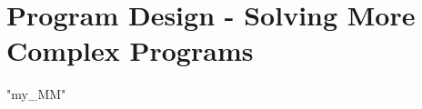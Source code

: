 \chapter{Program Design - Solving More Complex Programs}
\XeTeXlinebreaklocale "my_MM"  %
\begin{sloppypar}


\end{sloppypar}
